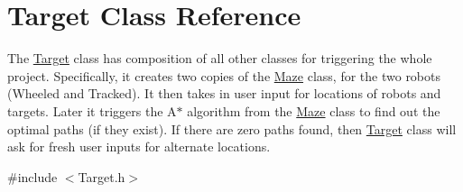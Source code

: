 \hypertarget{class_target}{}\section{Target Class Reference}
\label{class_target}


The \mbox{\hyperlink{class_target}{Target}} class has composition of all other classes for triggering the whole project. Specifically, it creates two copies of the \mbox{\hyperlink{class_maze}{Maze}} class, for the two robots (Wheeled and Tracked). It then takes in user input for locations of robots and targets. Later it triggers the A$\ast$ algorithm from the \mbox{\hyperlink{class_maze}{Maze}} class to find out the optimal paths (if they exist). If there are zero paths found, then \mbox{\hyperlink{class_target}{Target}} class will ask for fresh user inputs for alternate locations.  




{\ttfamily \#include $<$Target.\+h$>$}

